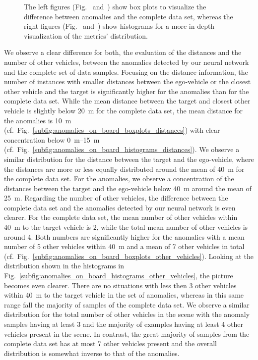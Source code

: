 \begin{figure}[t]
{    The left figures (Fig.~\protect{} and~\protect{}) show box plots to visualize the difference between anomalies and the complete data set, whereas the right figures (Fig.~\protect{} and~\protect{}) show histograms for a more in-depth visualization of the metrics' distribution.}
    \label{fig:anomaly_ngsim}
\end{figure}

We observe a clear difference for both, the evaluation of the distances and the number of other vehicles, between the anomalies detected by our neural network and the complete set of data samples.
Focusing on the distance information, the number of instances with smaller distances between the ego-vehicle or the closest other vehicle and the target is significantly higher for the anomalies than for the complete data set.
While the mean distance between the target and closest other vehicle is slightly below \SI{20}{\meter} for the complete data set, the mean distance for the anomalies is \SI{10}{\meter} (cf.\ Fig.~\ref{subfig:anomalies_on_board_boxplots_distances}) with clear concentration below \SIrange{0}{15}{\meter} (cf.\ Fig.~\ref{subfig:anomalies_on_board_histograms_distances}).
We observe a similar distribution for the distance between the target and the ego-vehicle, where the distances are more or less equally distributed around the mean of \SI{40}{\meter} for the complete data set.
For the anomalies, we observe a concentration of the distances between the target and the ego-vehicle below \SI{40}{\meter} around the mean of \SI{25}{\meter}.
Regarding the number of other vehicles, the difference between the complete data set and the anomalies detected by our neural network is even clearer.
For the complete data set, the mean number of other vehicles within \SI{40}{\meter} to the target vehicle is \num{2}, while the total mean number of other vehicles is around \num{4}.
Both numbers are significantly higher for the anomalies with a mean number of \num{5} other vehicles within \SI{40}{\meter} and a mean of \num{7} other vehicles in total (cf.\ Fig.~\ref{subfig:anomalies_on_board_boxplots_other_vehicles}).
Looking at the distribution shown in the histograms in Fig.~\ref{subfig:anomalies_on_board_histograms_other_vehicles}, the picture becomes even clearer. 
There are no situations with less then \num{3} other vehicles within \SI{40}{\meter} to the target vehicle in the set of anomalies, whereas in this same range fall the majority of samples of the complete data set.
We observe a similar distribution for the total number of other vehicles in the scene with the anomaly samples having at least \num{3} and the majority of examples having at least \num{4} other vehicles present in the scene.
In contrast, the great majority of samples from the complete data set has at most \num{7} other vehicles present and the overall distribution is somewhat inverse to that of the anomalies.

